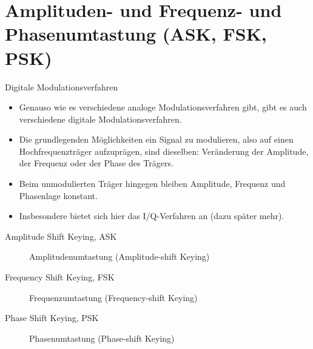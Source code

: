 \section{Amplituden- und Frequenz- und Phasenumtastung (ASK, FSK, PSK)}
\label{section:ask_fsk_afsk}
\begin{frame}{Digitale Modulationsverfahren}
    \begin{itemize}
        \item Genauso wie es verschiedene analoge Modulationsverfahren gibt, gibt es auch verschiedene digitale Modulationsverfahren.
        \item Die grundlegenden Möglichkeiten ein Signal zu modulieren, also auf einen Hochfrequenzträger aufzuprägen, sind dieselben: Veränderung der Amplitude, der Frequenz oder der Phase des Trägers.
        \item Beim unmodulierten Träger hingegen bleiben Amplitude, Frequenz und Phasenlage konstant.
        \item Insbesondere bietet sich hier das I/Q-Verfahren an (dazu später mehr).
    \end{itemize}
\end{frame}

\begin{frame}{Amplitude Shift Keying, ASK}
    \begin{figure}
        \caption{\scriptsize Amplitudenumtastung (Amplitude-shift Keying)}
        \label{ask}
    \end{figure}
\end{frame}

\begin{frame}{Frequency Shift Keying, FSK}
    \begin{figure}
        \caption{\scriptsize Frequenzumtastung (Frequency-shift Keying)}
        \label{fsk}
    \end{figure}
\end{frame}

\begin{frame}{Phase Shift Keying, PSK}
    \begin{figure}
        \caption{\scriptsize Phasenumtastung (Phase-shift Keying)}
        \label{psk}
    \end{figure}
\end{frame}

